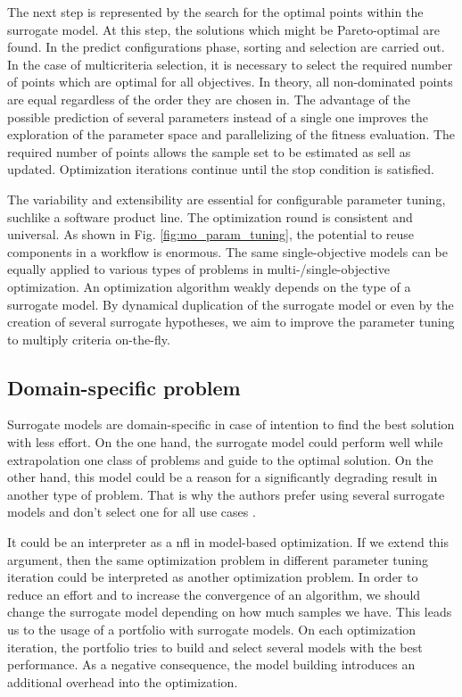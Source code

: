            The next step is represented by the search for the optimal points within the surrogate model. At this step, the solutions which might be Pareto-optimal are found. In the predict configurations phase, sorting and selection are carried out. In the case of multicriteria selection, it is necessary to select the required number of points which are optimal for all objectives. In theory, all non-dominated points are equal regardless of the order they are chosen in. The advantage of the possible prediction of several parameters instead of a single one improves the exploration of the parameter space and parallelizing of the fitness evaluation. The required number of points allows the sample set to be estimated as sell as updated. Optimization iterations continue until the stop condition is satisfied.
    
            The variability and extensibility are essential for configurable parameter tuning, suchlike a software product line. The optimization round is consistent and universal. As shown in Fig. \ref{fig:mo_param_tuning}, the potential to reuse components in a workflow is enormous. The same single-objective models can be equally applied to various types of problems in multi-/single-objective optimization. An optimization algorithm weakly depends on the type of a surrogate model. By dynamical duplication of the surrogate model or even by the creation of several surrogate hypotheses, we aim to improve the parameter tuning to multiply criteria on-the-fly.

        \subsection{Domain-specific problem}
        Surrogate models are domain-specific in case of intention to find the best solution with less effort. On the one hand, the surrogate model could perform well while extrapolation one class of problems and guide to the optimal solution. On the other hand, this model could be a reason for a significantly degrading result in another type of problem. That is why the authors prefer using several surrogate models and don't select one for all use cases \cite{SoftSurvey}.

        It could be an interpreter as a \Gls{nfl} in model-based optimization. If we extend this argument, then the same optimization problem in different parameter tuning iteration could be interpreted as another optimization problem. In order to reduce an effort and to increase the convergence of an algorithm, we should change the surrogate model depending on how much samples we have. 
        This leads us to the usage of a portfolio with surrogate models. On each optimization iteration, the portfolio tries to build and select several models with the best performance.  As a negative consequence, the model building introduces an additional overhead into the optimization.


